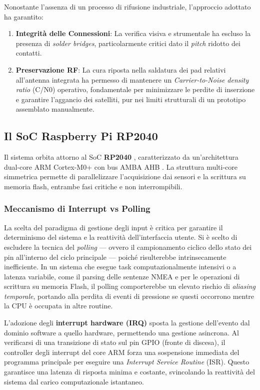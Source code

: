 Nonostante l'assenza di un processo di rifusione industriale, l'approccio adottato ha garantito:
\begin{enumerate}
\item \textbf{Integrità delle Connessioni}: La verifica visiva e strumentale ha escluso la presenza di \textit{solder bridges}, particolarmente critici dato il \textit{pitch} ridotto dei contatti.
\item \textbf{Preservazione RF}: La cura riposta nella saldatura dei pad relativi all'antenna integrata ha permesso di mantenere un \textit{Carrier-to-Noise density ratio} (C/N0) operativo, fondamentale per minimizzare le perdite di inserzione e garantire l'aggancio dei satelliti, pur nei limiti strutturali di un prototipo assemblato manualmente.
\end{enumerate}


\subsection{Il SoC Raspberry Pi RP2040}
Il sistema orbita attorno al SoC \textbf{RP2040} \cite{rp2040_ds}, caratterizzato da un'architettura dual-core ARM Cortex-M0+ con bus AMBA AHB \cite{rp2040_ds}. La struttura multi-core simmetrica permette di parallelizzare l'acquisizione dai sensori e la scrittura su memoria flash, entrambe fasi critiche e non interrompibili.

\subsubsection*{Meccanismo di Interrupt vs Polling}

La scelta del paradigma di gestione degli input è critica per garantire il determinismo del sistema e la reattività dell'interfaccia utente. Si è scelto di escludere la tecnica del \textit{polling} — ovvero il campionamento ciclico dello stato dei pin all'interno del ciclo principale — poiché risulterebbe intrinsecamente inefficiente. In un sistema che esegue task computazionalmente intensivi o a latenza variabile, come il parsing delle sentenze NMEA e per le operazioni di scrittura su memoria Flash, il polling comporterebbe un elevato rischio di \textit{aliasing temporale}, portando alla perdita di eventi di pressione se questi occorrono mentre la CPU è occupata in altre routine.

L'adozione degli \textbf{interrupt hardware (IRQ)} sposta la gestione dell'evento dal dominio software a quello hardware, permettendo una gestione asincrona. Al verificarsi di una transizione di stato sul pin GPIO (fronte di discesa), il controller degli interrupt del core ARM forza una sospensione immediata del programma principale per eseguire una \textit{Interrupt Service Routine} (ISR). Questo garantisce una latenza di risposta minima e costante, svincolando la reattività del sistema dal carico computazionale istantaneo.



